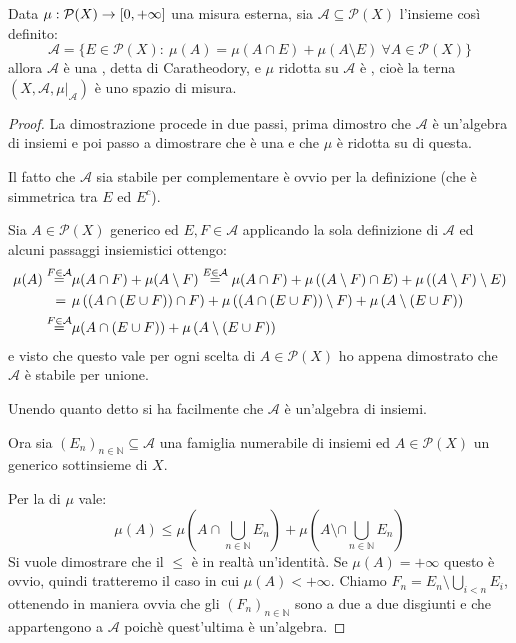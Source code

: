 \begin{theorem}
	Data $\mu:\mathcal P(X)\to [0,+\infty]$ una misura esterna, sia $\mathcal A\subseteq \mathcal P(X)$ l'insieme così definito:
	\begin{equation*}
		\mathcal A=\{E\in\mathcal P(X):\ \mu(A)=\mu(A\cap E)+\mu(A\setminus E)\ \forall A\in \mathcal P(X)\}
	\end{equation*}
	allora $\mathcal A$ è una \sigalg{}, detta \sigalg{} di Caratheodory, e $\mu$ ridotta su $\mathcal A$ è \sigadd{}, cioè la terna $(X,\mathcal A,\mu|_{\mathcal A})$ è uno spazio di misura.
\end{theorem}
\begin{proof}
	La dimostrazione procede in due passi, prima dimostro che $\mathcal A$ è un'algebra di insiemi e poi passo a dimostrare che è una \sigalg{} e che $\mu$ è \sigadd{} ridotta su di questa.
	
	Il fatto che $\mathcal A$ sia stabile per complementare è ovvio per la definizione (che è simmetrica tra $E$ ed $E^c$).
	
	Sia $A\in\mathcal P(X)$ generico ed $E,F\in\mathcal A$ applicando la sola definizione di $\mathcal A$ ed alcuni passaggi insiemistici ottengo:
	\begin{align*}
		\mu(A)\stackrel{F\in\mathcal A}{=}&\mu(A\cap F)+\mu(A\setminus F)\stackrel{E\in\mathcal A}{=}
		\mu(A\cap F)+\mu\left((A\setminus F)\cap E\right)+\mu\left((A\setminus F)\setminus E\right)\\
		=\hspace{0.4em}&\mu\left((A\cap (E\cup F))\cap F\right)+\mu\left((A\cap (E\cup F))\setminus F\right)+
		\mu\left(A\setminus(E\cup F)\right)\\
		\stackrel{F\in\mathcal A}{=}&\mu(A\cap (E\cup F))+\mu\left(A\setminus(E\cup F)\right)
	\end{align*}
	e visto che questo vale per ogni scelta di $A\in\mathcal P(X)$ ho appena dimostrato che $\mathcal A$ è stabile per unione.
	
	Unendo quanto detto si ha facilmente che $\mathcal A$ è un'algebra di insiemi.
	
	Ora sia $(E_n)_{n\in\mathbb N}\subseteq \mathcal A$ una famiglia numerabile di insiemi ed $A\in\mathcal P(X)$ un generico sottinsieme di $X$.
	
	Per la \sigsubadd[ità] di $\mu$ vale:
	\begin{equation}\label{DisuguaglianzaFacileCaratheodory}
		\mu(A)\le \mu\left(A\cap\bigcup_{n\in\mathbb N} E_n\right)+\mu\left(A\setminus\cap\bigcup_{n\in\mathbb N} E_n\right)
	\end{equation}
	Si vuole dimostrare che il $\le$ è in realtà un'identità. Se $\mu(A)=+\infty$ questo è ovvio, quindi tratteremo il caso in cui $\mu(A)<+\infty$. Chiamo $F_n=E_n\setminus \bigcup_{i<n} E_i$, ottenendo in maniera ovvia che gli $(F_n)_{n\in\mathbb N}$ sono a due a due disgiunti e che appartengono a $\mathcal A$ poichè quest'ultima è un'algebra.
	

\end{proof}
